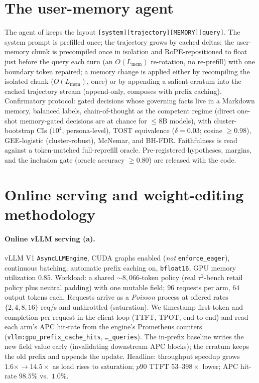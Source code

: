 \section{The user-memory agent}
\label{app:memory-agent}
The agent of  keeps the layout \texttt{[system][trajectory][MEMORY][query]}.
The system prompt is prefilled once; the trajectory grows by cached deltas; the user-memory
chunk is precompiled once in isolation and RoPE-repositioned to float just before the query
each turn (an $O(L_\text{mem})$ re-rotation, no re-prefill) with one boundary token repaired;
a memory change is applied either by recompiling the isolated chunk ($O(L_\text{mem})$, once)
or by appending a salient erratum into the cached trajectory stream (append-only, composes
with prefix caching). Confirmatory protocol: gated decisions whose governing facts live in a
Markdown memory, balanced labels, chain-of-thought as the competent regime (direct one-shot
memory-gated decisions are at chance for $\le$8B models), with cluster-bootstrap CIs
($10^4$, persona-level), TOST equivalence ($\delta{=}0.03$; cosine $\ge0.98$), GEE-logistic
(cluster-robust), McNemar, and BH-FDR. Faithfulness is read against a token-matched
full-reprefill oracle. Pre-registered hypotheses, margins, and the inclusion gate (oracle
accuracy $\ge0.80$) are released with the code.

\section{Online serving and weight-editing methodology}
\label{app:systems}
\paragraph{Online vLLM serving (a).} vLLM V1 \texttt{AsyncLLMEngine}, CUDA graphs enabled
(\emph{not} \texttt{enforce\_eager}), continuous batching, automatic prefix caching on, \texttt{bfloat16},
GPU memory utilization $0.85$. Workload: a shared ${\sim}8{,}066$-token policy (real
$\tau^2$-bench retail policy plus neutral padding) with one mutable field; $96$ requests per arm, $64$
output tokens each. Requests arrive as a \emph{Poisson} process at offered rates $\{2,4,8,16\}$ req/s and
unthrottled (saturation). We timestamp first-token and completion per request in the client loop (TTFT,
TPOT, end-to-end) and read each arm's APC hit-rate from the engine's Prometheus counters
(\texttt{vllm:gpu\_prefix\_cache\_hits}, \texttt{\ldots\_queries}). The in-prefix
baseline writes the new field value
early (invalidating downstream APC blocks); the erratum keeps the old prefix and appends the update.
Headline: throughput speedup grows $1.6\times{\to}14.5\times$ as load rises to saturation; $p90$ TTFT
$53$--$398\times$ lower; APC hit-rate $98.5\%$ vs.\ $1.0\%$.

